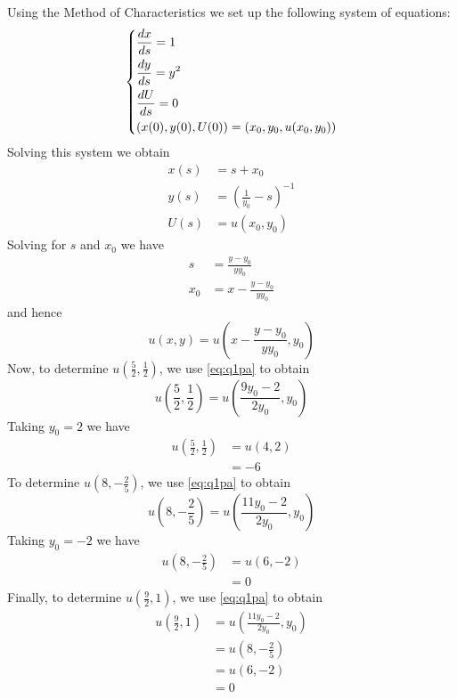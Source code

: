 \documentclass{article}
\begin{document}
Using the Method of Characteristics we set up the following system of
equations:
%
\begin{equation*}
    \begin{dcases}
        \frac{d x}{d s} = 1 \\
        \frac{d y}{d s} = y^2 \\
        \frac{d U}{d s} = 0 \\
        \left( x(0), y(0), U(0)\right) = \left( x_0, y_0, u(x_0, y_0) \right)
    \end{dcases}
\end{equation*}
%
Solving this system we obtain
%
\begin{align*}
    x(s) &= s + x_0 \\
    y(s) &= \left(\frac{1}{y_0} - s\right)^{-1} \\
    U(s) &= u(x_0, y_0)
\end{align*}
%
Solving for $s$ and $x_0$ we have
%
\begin{align*}
    s &= \frac{y - y_0}{y y_0} \\
    x_0 &= x - \frac{y - y_0}{y y_0}
\end{align*}
%
and hence
%
\begin{equation}
    u(x, y) = u\left(x - \frac{y - y_0}{y y_0}, y_0\right)
    \label{eq:q1pa}
\end{equation}
%
Now, to determine $u\left(\frac{5}{2}, \frac{1}{2}\right)$, we use
\eqref{eq:q1pa} to obtain
%
\begin{equation*}
    u\left(\frac{5}{2}, \frac{1}{2}\right) = u\left(\frac{9 y_0 - 2}{2 y_0}, y_0\right)
\end{equation*}
%
Taking $y_0 = 2$ we have
%
\begin{align*}
    u\left(\frac{5}{2}, \frac{1}{2}\right) &= u(4, 2) \\
    &= -6
\end{align*}
%
To determine $u\left(8,-\frac{2}{5}\right)$, we use
\eqref{eq:q1pa} to obtain
%
\begin{equation*}
    u\left(8, -\frac{2}{5}\right) = u\left(\frac{11 y_0 - 2}{2 y_0}, y_0\right)
\end{equation*}
%
Taking $y_0 = -2$ we have
%
\begin{align*}
    u\left(8, -\frac{2}{5}\right) &= u(6, -2) \\
    &= 0
\end{align*}
%
Finally, to determine $u\left(\frac{9}{2},1\right)$, we use
\eqref{eq:q1pa} to obtain
%
\begin{align*}
    u\left(\frac{9}{2}, 1\right)
        &= u\left(\frac{11 y_0 - 2}{2 y_0}, y_0\right) \\
        &= u\left(8, -\frac{2}{5}\right) \\
        &= u(6, -2) \\
        &= 0
\end{align*}
\end{document}
